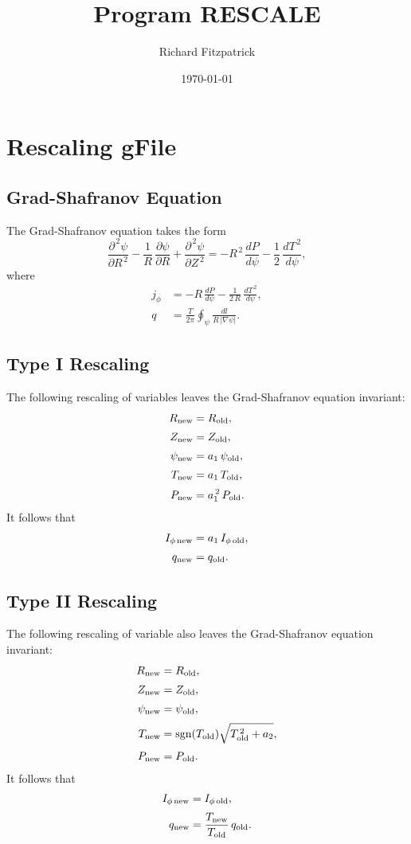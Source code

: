 \documentclass[12pt]{article}
\title{\bf Program {\sc RESCALE}}
\date{\today}
\author{Richard Fitzpatrick}
\begin{document}
\maketitle

\section{Rescaling gFile}
\subsection{Grad-Shafranov Equation}
The Grad-Shafranov equation takes the form
\begin{equation}
\frac{\partial^{\,2}\psi}{\partial R^{\,2}}-\frac{1}{R}\,\frac{\partial\psi}{\partial R} + \frac{\partial^{\,2}\psi}{\partial Z^{\,2}} = -R^{\,2}\,\frac{dP}{d\psi} - \frac{1}{2}\,\frac{dT^{\,2}}{d\psi},
\end{equation}
where
\begin{align}
j_\phi &= -R\,\frac{dP}{d\psi}- \frac{1}{2\,R}\,\frac{dT^{\,2}}{d\psi},\\[0.5ex]
q &= \frac{T}{2\pi}\oint_\psi \frac{dl}{R\,|\nabla \psi|}.
\end{align}

\subsection{Type I Rescaling}
The following rescaling of variables leaves the Grad-Shafranov equation invariant:
\begin{align}
R_{\rm new}&=R_{\rm old},\\[0.5ex]
Z_{\rm new}&=Z_{\rm old},\\[0.5ex]
\psi_{\rm new} &= a_1\,\psi_{\rm old},\\[0.5ex]
T_{\rm new} &=a_1\,T_{\rm old},\\[0.5ex]
P_{\rm new} &=a_1^{\,2}\,P_{\rm old}.
\end{align}
It follows that
\begin{align}
I_{\phi\,{\rm new}} &= a_1\,I_{\phi\,{\rm old}},\\[0.5ex]
q_{\rm new} &= q_{\rm old}.
\end{align} 

\subsection{Type II Rescaling}
The following rescaling of variable also leaves the Grad-Shafranov equation invariant:
\begin{align}
R_{\rm new}&=R_{\rm old},\\[0.5ex]
Z_{\rm new}&=Z_{\rm old},\\[0.5ex]
\psi_{\rm new} &=\psi_{\rm old},\\[0.5ex]
T_{\rm new} &={\rm sgn}(T_{\rm old})\sqrt{T_{\rm old}^{\,2}+a_2},\\[0.5ex]
P_{\rm new} &=P_{\rm old}.
\end{align}
It follows that
\begin{align}
I_{\phi\,{\rm new}} &=I_{\phi\,{\rm old}},\\[0.5ex]
q_{\rm new} &= \frac{T_{\rm new}}{T_{\rm old}}\,q_{\rm old}.
\end{align} 
\end{document}
